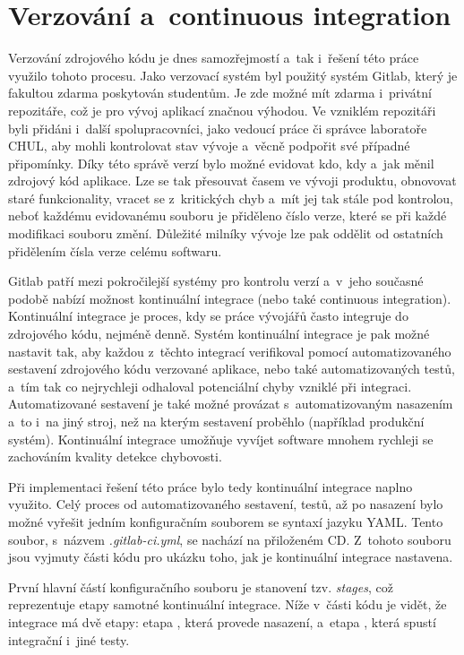 \documentclass[thesis=M,czech]{FITthesis}[2012/06/26]
\begin{document}
\section{Verzování a~continuous integration} \label{sec:impl_gitlab}
Verzování zdrojového kódu je dnes samozřejmostí a~tak i~řešení této práce využilo tohoto procesu. Jako verzovací systém byl použitý systém Gitlab, který je fakultou zdarma poskytován studentům. Je zde možné mít zdarma i~privátní repozitáře, což je pro vývoj aplikací značnou výhodou. Ve vzniklém repozitáři byli přidáni i~další spolupracovníci, jako vedoucí práce či správce laboratoře CHUL, aby mohli kontrolovat stav vývoje a~věcně podpořit své případné připomínky. Díky této správě verzí bylo možné evidovat kdo, kdy a~jak měnil zdrojový kód aplikace. Lze se tak přesouvat časem ve vývoji produktu, obnovovat staré funkcionality, vracet se z~kritických chyb a~mít jej tak stále pod kontrolou, neboť každému evidovanému souboru je přiděleno číslo verze, které se při každé modifikaci souboru změní. Důležité milníky vývoje lze pak oddělit od ostatních přidělením čísla verze celému softwaru.

Gitlab patří mezi pokročilejší systémy pro kontrolu verzí a~v~jeho současné podobě nabízí možnost kontinuální integrace (nebo také continuous integration). Kontinuální integrace je proces, kdy se práce vývojářů často integruje do zdrojového kódu, nejméně denně. Systém kontinuální integrace je pak možné nastavit tak, aby každou z~těchto integrací verifikoval pomocí automatizovaného sestavení zdrojového kódu verzované aplikace, nebo také automatizovaných testů, a~tím tak co nejrychleji odhaloval potenciální chyby vzniklé při integraci. Automatizované sestavení je také možné provázat s~automatizovaným nasazením a~to i~na jiný stroj, než na kterým sestavení proběhlo (například produkční systém). Kontinuální integrace umožňuje vyvíjet software mnohem rychleji se zachováním kvality detekce chybovosti. 

Při implementaci řešení této práce bylo tedy kontinuální integrace naplno využito. Celý proces od automatizovaného sestavení, testů, až po nasazení bylo možné vyřešit jedním konfiguračním souborem se syntaxí jazyku YAML. Tento soubor, s~názvem \textit{.gitlab-ci.yml}, se nachází na přiloženém CD. Z~tohoto souboru jsou vyjmuty části kódu pro ukázku toho, jak je kontinuální integrace nastavena.

První hlavní částí konfiguračního souboru je stanovení tzv. \textit{stages}, což reprezentuje etapy samotné kontinuální integrace. Níže v~části kódu je vidět, že integrace má dvě etapy: etapa , která provede nasazení, a~etapa , která spustí integrační i~jiné testy.\\
\end{document}
